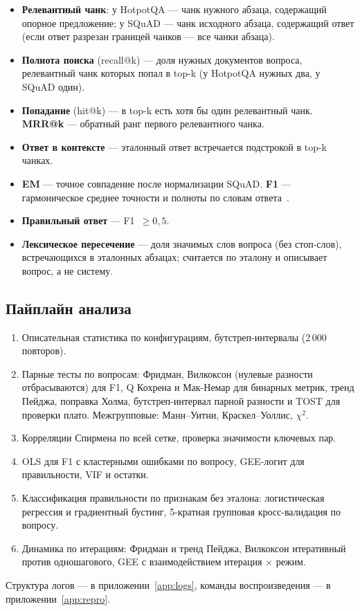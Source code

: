 \begin{itemize}
\item \textbf{Релевантный чанк}: у HotpotQA --- чанк нужного абзаца, содержащий опорное предложение; у SQuAD --- чанк исходного абзаца, содержащий ответ (если ответ разрезан границей чанков --- все чанки абзаца).
\item \textbf{Полнота поиска} (recall@k) --- доля нужных документов вопроса, релевантный чанк которых попал в top-k (у HotpotQA нужных два, у SQuAD один).
\item \textbf{Попадание} (hit@k) --- в top-k есть хотя бы один релевантный чанк. \textbf{MRR@k} --- обратный ранг первого релевантного чанка.
\item \textbf{Ответ в контексте} --- эталонный ответ встречается подстрокой в top-k чанках.
\item \textbf{EM} --- точное совпадение после нормализации SQuAD. \textbf{F1} --- гармоническое среднее точности и полноты по словам ответа~\cite{squad}.
\item \textbf{Правильный ответ} --- F1~$\ge 0{,}5$.
\item \textbf{Лексическое пересечение} --- доля значимых слов вопроса (без стоп-слов), встречающихся в эталонных абзацах; считается по эталону и описывает вопрос, а не систему.
\end{itemize}

\subsection{Пайплайн анализа}

\begin{enumerate}
\item Описательная статистика по конфигурациям, бутстреп-интервалы (2\,000 повторов).
\item Парные тесты по вопросам: Фридман, Вилкоксон (нулевые разности отбрасываются) для F1, Q Кохрена и Мак-Немар для бинарных метрик, тренд Пейджа, поправка Холма, бутстреп-интервал парной разности и TOST для проверки плато. Межгрупповые: Манн--Уитни, Краскел--Уоллис, $\chi^2$.
\item Корреляции Спирмена по всей сетке, проверка значимости ключевых пар.
\item OLS для F1 с кластерными ошибками по вопросу, GEE-логит для правильности, VIF и остатки.
\item Классификация правильности по признакам без эталона: логистическая регрессия и градиентный бустинг, 5-кратная групповая кросс-валидация по вопросу.
\item Динамика по итерациям: Фридман и тренд Пейджа, Вилкоксон итеративный против одношагового, GEE с взаимодействием итерация $\times$ режим.
\end{enumerate}

Структура логов --- в приложении~\ref{app:logs}, команды воспроизведения --- в приложении~\ref{app:repro}.
